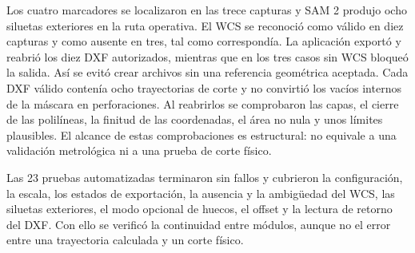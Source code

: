 Los cuatro marcadores se localizaron en las trece capturas y SAM 2 produjo ocho siluetas exteriores en la ruta operativa. El WCS se reconoció como válido en diez capturas y como ausente en tres, tal como correspondía. La aplicación exportó y reabrió los diez DXF autorizados, mientras que en los tres casos sin WCS bloqueó la salida. Así se evitó crear archivos sin una referencia geométrica aceptada. Cada DXF válido contenía ocho trayectorias de corte y no convirtió los vacíos internos de la máscara en perforaciones. Al reabrirlos se comprobaron las capas, el cierre de las polilíneas, la finitud de las coordenadas, el área no nula y unos límites plausibles. El alcance de estas comprobaciones es estructural: no equivale a una validación metrológica ni a una prueba de corte físico.

Las 23 pruebas automatizadas terminaron sin fallos y cubrieron la configuración, la escala, los estados de exportación, la ausencia y la ambigüedad del WCS, las siluetas exteriores, el modo opcional de huecos, el offset y la lectura de retorno del DXF. Con ello se verificó la continuidad entre módulos, aunque no el error entre una trayectoria calculada y un corte físico.
